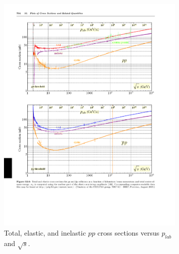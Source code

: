 \begin{figure}[!h]
    \centering
    \begin{subfigure}[b]{1.0\textwidth}
        \centering
        \includegraphics[width=1.0\textwidth]{chap2/pdg_pp_cross_section.pdf}
        \caption[Total, elastic, and inelastic $pp$ cross sections versus
                 $p_{lab}$ and $\sqrt{s}$.]{
                 Total, elastic, and inelastic $pp$ cross sections versus
                 $p_{lab}$ and $\sqrt{s}$.
                }
        \label{fig:pdg_pp_cross_section}
    \end{subfigure}
    \vspace{0.1cm}
    \\
    \begin{subfigure}[b]{1.0\textwidth}
        \centering

\end{subfigure}
\end{figure}
